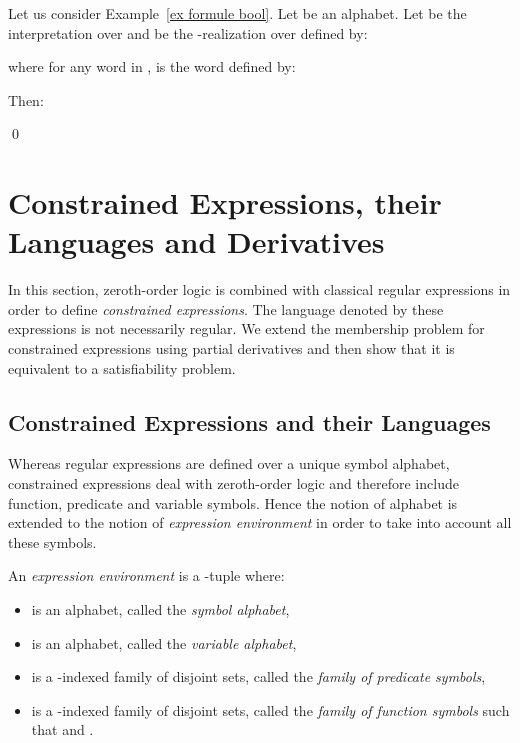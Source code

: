 \documentclass[a4paper]{llncs}
\begin{document}
  
  \begin{example}\label{ex inter real}
    Let us consider Example~\ref{ex formule bool}. Let  be an alphabet. Let  be the interpretation  over  and  be the -realization over  defined by:
  
  where for any word  in ,  is the word defined by:
  
  Then:    
    
    \qed       
  \end{example}
  
 
\section{Constrained Expressions, their Languages and Derivatives}\label{sec:cons expr lang and der}

  In this section, zeroth-order logic is combined with classical regular expressions in order to define \emph{constrained expressions}. The language denoted by these expressions is not necessarily regular. We extend the membership problem for constrained expressions using partial derivatives and then show that it is equivalent to a satisfiability problem.

\subsection{Constrained Expressions and their Languages}

  Whereas regular expressions are defined over a unique symbol alphabet, constrained expressions deal with zeroth-order logic and therefore include function, predicate and variable symbols. Hence the notion of alphabet is extended to the notion of \emph{expression environment} in order to take into account
all these symbols.
  
  \begin{definition}
    An \emph{expression environment} is a -tuple  where:
    \begin{itemize}
      \item  is an alphabet, called the \emph{symbol alphabet},
      \item  is an alphabet, called the \emph{variable alphabet},
      \item  is a -indexed family of disjoint sets, called the \emph{family of predicate symbols},
      \item  is a -indexed family of disjoint sets, called the \emph{family of function symbols} such that  and .
    \end{itemize}
  \end{definition}
  
\end{document}
